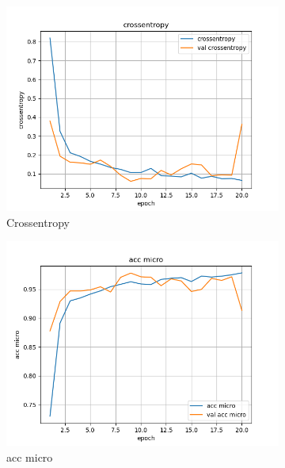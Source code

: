 \documentclass[a4paper]{article}
\begin{document}
\begin{figure}[ht]
    \centering
    \begin{subfigure}{0.32\textwidth}
        \centering
        \includegraphics[width=\linewidth]{../logs/resnet_allw_img256_2/crossentropy.png}
        \caption{Crossentropy}
    \end{subfigure}
    \begin{subfigure}{0.32\textwidth}
        \centering
        \includegraphics[width=\linewidth]{../logs/resnet_allw_img256_2/acc micro.png}
        \caption{acc micro}
    \end{subfigure}
    \begin{subfigure}{0.32\textwidth}
        \centering

\end{subfigure}
\end{figure}
\end{document}
